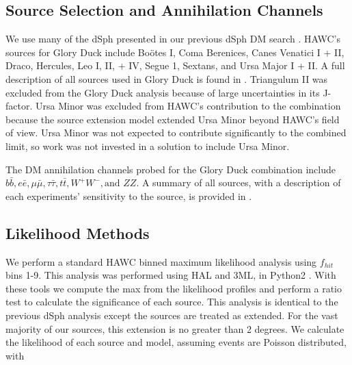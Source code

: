 \subsection{Source Selection and Annihilation Channels}

We use many of the dSph presented in our previous dSph DM search \cite{Albert_2018}.
HAWC's sources for Glory Duck include Boötes I, Coma Berenices, Canes Venatici I + II, Draco, Hercules, Leo I, II, + IV, Segue 1, Sextans, and Ursa Major I + II.
A full description of all sources used in Glory Duck is found in .
Triangulum II was excluded from the Glory Duck analysis because of large uncertainties in its J-factor.
Ursa Minor was excluded from HAWC's contribution to the combination because the source extension model extended Ursa Minor beyond HAWC's field of view.
Ursa Minor was not expected to contribute significantly to the combined limit, so work was not invested in a solution to include Ursa Minor.

The DM annihilation channels probed for the Glory Duck combination include $b\bar{b}, e\bar{e}, \mu\bar{\mu}, \tau\bar{\tau}, t\bar{t}, W^+W^-, \textrm{and }ZZ$.
A summary of all sources, with a description of each experiments' sensitivity to the source, is provided in .




\subsection{Likelihood Methods} \label{sec:ll_methods}

We perform a standard HAWC binned maximum likelihood analysis using $f_{hit}$ bins 1-9.
This analysis was performed using HAL and 3ML, in Python2 \cite{Abeysekara_2017, vianello2015multimission}.
With these tools we compute the max from the likelihood profiles and perform a ratio test to calculate the significance of each source.
This analysis is identical to the previous dSph analysis \cite{Albert_2018} except the sources are treated as extended.
For the vast majority of our sources, this extension is no greater than 2 degrees.
We calculate the likelihood of each source and model, assuming events are Poisson distributed, with
\hwcpsLLH

